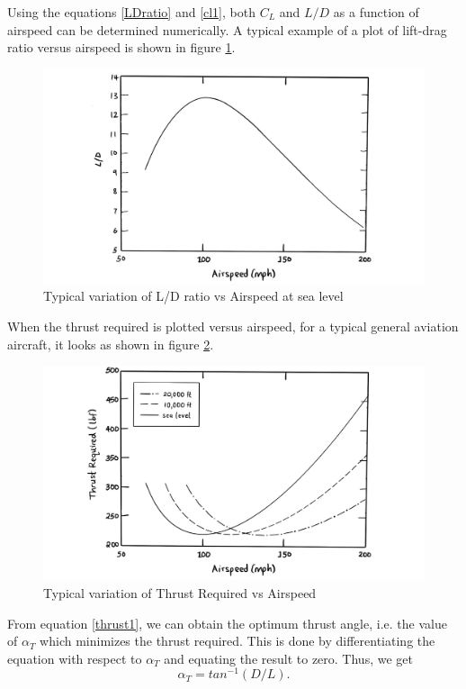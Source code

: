 \documentclass[letterpaper,12pt]{article}
\begin{document}
Using the equations \ref{LDratio} and \ref{cl1}, both $C_L$ and $L/D$ as a function of airspeed can be determined numerically. A typical example of a plot of lift-drag ratio versus airspeed is shown in figure \ref{LDRvsV}.
\begin{figure}[H]
\includegraphics[scale=0.3]{plot_LD}
\centering
\caption{Typical variation of L/D ratio vs Airspeed at sea level}
\label{LDRvsV}
\end{figure}

When the thrust required is plotted versus airspeed, for a typical general aviation aircraft, it looks as shown in figure \ref{TRvsV}.
\begin{figure}[H]
\includegraphics[scale=0.3]{plot_TR}
\centering
\caption{Typical variation of Thrust Required vs Airspeed}
\label{TRvsV}
\end{figure}

From equation \ref{thrust1}, we can obtain the optimum thrust angle, i.e. the value of $\alpha_T$ which minimizes the thrust required. This is done by differentiating the equation with respect to $\alpha_T$ and equating the result to zero. Thus, we get
\begin{equation}
\boxed{
\alpha_T=tan^{-1}(D/L).
}
\label{alphaT1}
\end{equation}
\end{document}
